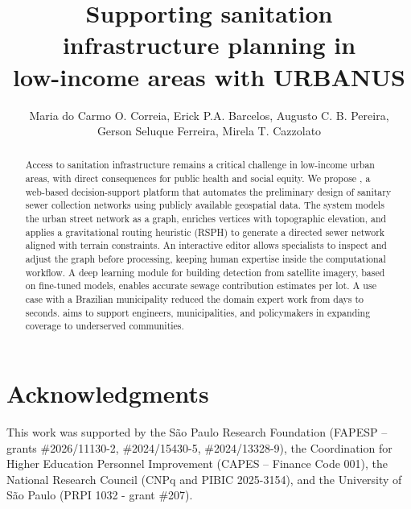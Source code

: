 \documentclass[12pt]{article}
\title{Supporting sanitation infrastructure planning in\\low-income areas with URBANUS}
\author{Maria do Carmo O. Correia\inst{1,2}, Erick P.A. Barcelos\inst{1},
    Augusto C. B. Pereira\inst{1},\\
    Gerson Seluque Ferreira\inst{2}, Mirela T. Cazzolato\inst{1}}
\begin{document}
 
 
\maketitle

\begin{abstract}
Access to sanitation infrastructure remains a critical challenge in low-income urban areas, with direct consequences for public health and social equity.
We propose \method, a web-based decision-support platform that automates the preliminary design of sanitary sewer collection networks using publicly available geospatial data.
The system models the urban street network as a graph, enriches vertices with topographic elevation, and applies a gravitational routing heuristic (RSPH) to generate a directed sewer network aligned with terrain constraints.
An interactive editor allows specialists to inspect and adjust the graph before processing, keeping human expertise inside the computational workflow.
A deep learning module for building detection from satellite imagery, based on fine-tuned models, enables accurate sewage contribution estimates per lot.
A use case with a Brazilian municipality reduced the domain expert work from days to seconds.
\method aims to support engineers, municipalities, and policymakers in expanding coverage to underserved communities.
\end{abstract}








\section*{Acknowledgments}

This work was supported by the São Paulo Research Foundation (FAPESP -- grants \#2026/11130-2, \#2024/15430-5, \#2024/13328-9), the Coordination for Higher Education Personnel Improvement (CAPES -- Finance Code 001), the National Research Council (CNPq and PIBIC 2025-3154), and the University of São Paulo (PRPI 1032 - grant \#207). 



\end{document}
